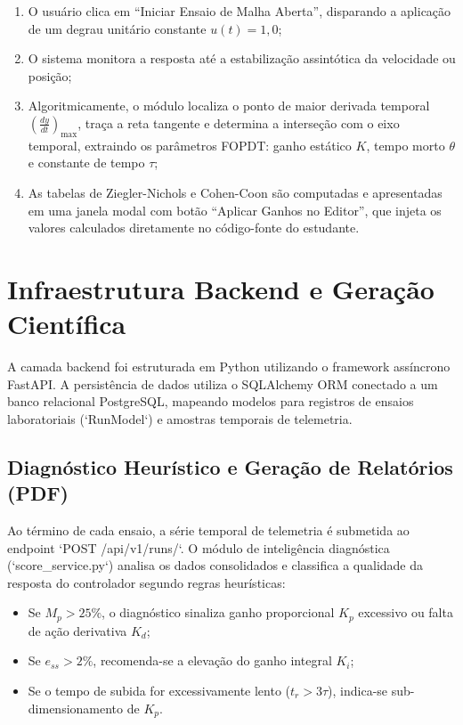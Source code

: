 \begin{enumerate}
    \item O usuário clica em ``Iniciar Ensaio de Malha Aberta'', disparando a aplicação de um degrau unitário constante $u(t) = 1{,}0$;
    \item O sistema monitora a resposta até a estabilização assintótica da velocidade ou posição;
    \item Algoritmicamente, o módulo localiza o ponto de maior derivada temporal $\left(\frac{dy}{dt}\right)_{\max}$, traça a reta tangente e determina a interseção com o eixo temporal, extraindo os parâmetros FOPDT: ganho estático $K$, tempo morto $\theta$ e constante de tempo $\tau$;
    \item As tabelas de Ziegler-Nichols e Cohen-Coon são computadas e apresentadas em uma janela modal com botão ``Aplicar Ganhos no Editor'', que injeta os valores calculados diretamente no código-fonte do estudante.
\end{enumerate}

\section{Infraestrutura Backend e Geração Científica}
\label{sec:backend_servicos}

A camada backend foi estruturada em Python utilizando o framework assíncrono FastAPI. A persistência de dados utiliza o SQLAlchemy ORM conectado a um banco relacional PostgreSQL, mapeando modelos para registros de ensaios laboratoriais (`RunModel`) e amostras temporais de telemetria.

\subsection{Diagnóstico Heurístico e Geração de Relatórios (PDF)}
\label{subsec:diagnostico_pdf}

Ao término de cada ensaio, a série temporal de telemetria é submetida ao endpoint `POST /api/v1/runs/`. O módulo de inteligência diagnóstica (`score_service.py`) analisa os dados consolidados e classifica a qualidade da resposta do controlador segundo regras heurísticas:

\begin{itemize}
    \item Se $M_p > 25\%$, o diagnóstico sinaliza ganho proporcional $K_p$ excessivo ou falta de ação derivativa $K_d$;
    \item Se $e_{ss} > 2\%$, recomenda-se a elevação do ganho integral $K_i$;
    \item Se o tempo de subida for excessivamente lento ($t_r > 3\tau$), indica-se sub-dimensionamento de $K_p$.
\end{itemize}

